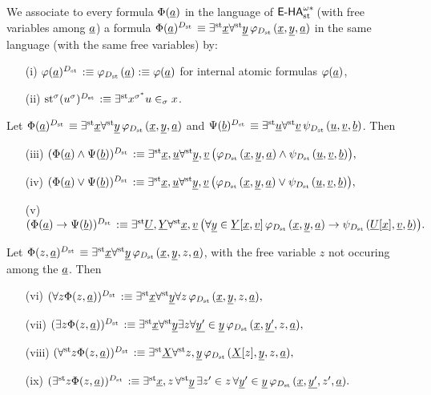\begin{dfn}
We associate to every formula $\Phi (\tup{a})$ in the language of $\ehaststar$ (with free variables among $\tup{a}$) a formula $\Phi(\tup{a})^{\D}\equiv\existsst \tup{x}\forallst \tup{y} \, \phi_{\D} (\tup{x},\tup{y},\tup{a})$ in the same language (with the same free variables) by:
    \begin{itemize}
      \item[(i)] $\phi(\tup{a})^{\D}:\equiv \phi_{\D}(\tup{a}):\equiv \phi(\tup{a})$ for internal atomic formulas $\phi(\tup{a})$,
      \item[(ii)] $\st^{\sigma}(u^{\sigma})^{\D}:\equiv \existsst x^{\sigma^*} u \in_{\sigma} x$.
    \end{itemize}
Let $\Phi(\tup{a})^{\D}\equiv\existsst \tup{x}\forallst \tup{y} \, \phi_{\D} (\tup{x},\tup{y},\tup{a})$ and $\Psi(\tup{b})^{\D}\equiv\existsst \tup{u}\forallst \tup{v} \, \psi_{\D} (\tup{u},\tup{v},\tup{b})$. Then
    \begin{itemize}
      \item[(iii)] $(\Phi (\tup{a}) \land \Psi (\tup{b}))^{\D} :\equiv \existsst \tup{x},\tup{u} \forallst \tup{y},\tup{v} \, \big(\phi_{\D} (\tup{x},\tup{y},\tup{a}) \land \psi_{\D} (\tup{u},\tup{v},\tup{b})\big),$
      \item[(iv)] $(\Phi (\tup{a}) \lor \Psi (\tup{b}))^{\D}  :\equiv \existsst \tup{x},\tup{u} \forallst \tup{y},\tup{v} \, \big(\phi_{\D} (\tup{x},\tup{y},\tup{a}) \lor \psi_{\D} (\tup{u},\tup{v},\tup{b})\big),$

      \item[(v)] $(\Phi(\tup{a}) \to \Psi(\tup{b}))^{\D}  :\equiv   \existsst \tup{U},\tup{Y} \forallst \tup{x},\tup{v} \, \big(\forall \tup{y} \in \tup{Y}[\tup{x},\tup{v}]\, \phi_{\D} (\tup{x},\tup{y}, \tup{a})    \to\psi_{\D} (\tup{U}[\tup{x}],\tup{v}, \tup{b})\big).$
      \end{itemize}
Let $\Phi(z,\tup{a})^{\D}\equiv\existsst \tup{x}\forallst \tup{y} \, \phi_{\D} (\tup{x},\tup{y},z,\tup{a})$, with the free variable $z$ not occuring among the $\tup{a}$. Then
    \begin{itemize}
 \item[(vi)] $(\forall z\Phi(z,\tup{a}))^{\D} :\equiv \existsst \tup{x} \forallst \tup{y} \forall z \, \phi_{\D} (\tup{x},\tup{y},z,\tup{a}),$
 \item[(vii)] $(\exists z\Phi(z,\tup{a}))^{\D} :\equiv \existsst \tup{x} \forallst \tup{y} \exists z \forall \tup{y'} \in \tup{y}\, \phi_{\D} (\tup{x},\tup{y'},z,\tup{a}),$
 \item[(viii)] $(\forallst z\Phi(z,\tup{a}))^{\D} :\equiv \existsst \tup{X} \forallst z,\tup{y}  \, \phi_{\D} (\tup{X}[z],\tup{y},z,\tup{a}),$
 \item[(ix)] $(\existsst z\Phi(z,\tup{a}))^{\D} :\equiv \existsst \tup{x},z \, \forallst \tup{y} \, \exists z' \in z \, \forall \tup y' \in \tup{y}\, \phi_{\D} (\tup{x},\tup{y'},z',\tup{a}).$
\end{itemize}
\end{dfn}
